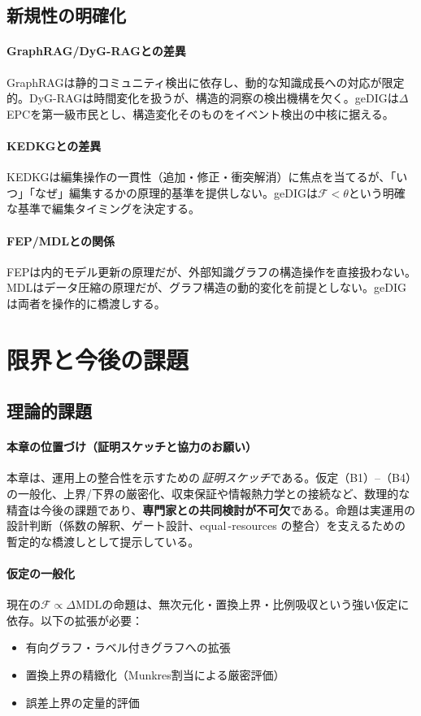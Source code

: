 \documentclass[ja=standard,xelatex]{bxjsarticle}
\newcommand{\F}{\mathcal{F}}
\begin{document}
\subsection{新規性の明確化}

\paragraph{GraphRAG/DyG-RAGとの差異}
GraphRAGは静的コミュニティ検出に依存し、動的な知識成長への対応が限定的。DyG-RAGは時間変化を扱うが、構造的洞察の検出機構を欠く。geDIGは$\Delta$EPCを第一級市民とし、構造変化そのものをイベント検出の中核に据える。

\paragraph{KEDKGとの差異}
KEDKGは編集操作の一貫性（追加・修正・衝突解消）に焦点を当てるが、「いつ」「なぜ」編集するかの原理的基準を提供しない。geDIGは$\F<\theta$という明確な基準で編集タイミングを決定する。

\paragraph{FEP/MDLとの関係}
FEPは内的モデル更新の原理だが、外部知識グラフの構造操作を直接扱わない。MDLはデータ圧縮の原理だが、グラフ構造の動的変化を前提としない。geDIGは両者を操作的に橋渡しする。

\section{限界と今後の課題}\label{sec:limits_future}

\subsection{理論的課題}

\paragraph{本章の位置づけ（証明スケッチと協力のお願い）}
本章は、運用上の整合性を示すための\,\emph{証明スケッチ}である。仮定（B1）–（B4）の一般化、上界/下界の厳密化、収束保証や情報熱力学との接続など、数理的な精査は今後の課題であり、\textbf{専門家との共同検討が不可欠}である。命題は実運用の設計判断（係数の解釈、ゲート設計、equal\,\mbox{-}resources の整合）を支えるための暫定的な橋渡しとして提示している。

\paragraph{仮定の一般化}
現在の$\F\propto\Delta\mathrm{MDL}$の命題は、無次元化・置換上界・比例吸収という強い仮定に依存。以下の拡張が必要：
\begin{itemize}
  \item 有向グラフ・ラベル付きグラフへの拡張
  \item 置換上界の精緻化（Munkres割当による厳密評価）
  \item 誤差上界の定量的評価
\end{itemize}
\end{document}
